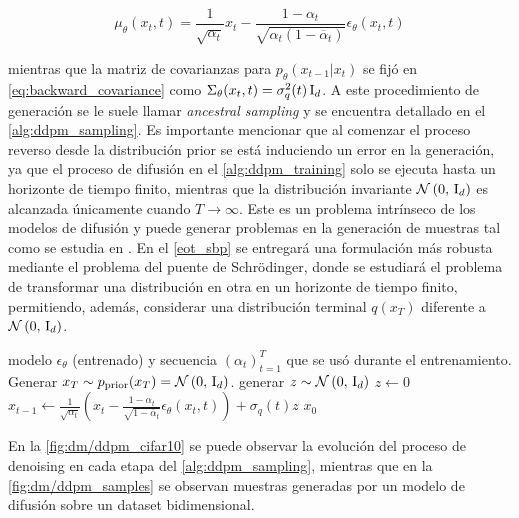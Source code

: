 \begin{equation*}
    \mu_\theta(x_t,t) = \frac{1}{\sqrt{\alpha_t}}x_t - \frac{1-\alpha_t}{\sqrt{\alpha_t(1-\overline{\alpha}_t)}}\epsilon_\theta(x_t,t)
\end{equation*}

mientras que la matriz de covarianzas para $p_\theta(x_{t-1}|x_t)$ se fijó en \eqref{eq:backward_covariance} como $\Sigma_\theta(x_t,t)=\sigma_q^2(t)\operatorname{I}_{d}$. A este procedimiento de generación se le suele llamar \textit{ancestral sampling} y se encuentra detallado en el \autoref{alg:ddpm_sampling}. Es importante mencionar que al comenzar el proceso reverso desde la distribución prior se está induciendo un error en la generación, ya que el proceso de difusión en el \autoref{alg:ddpm_training} solo se ejecuta hasta un horizonte de tiempo finito, mientras que la distribución invariante $\mathcal{N}\left(0,\,\operatorname{I}_{d}\right)$ es alcanzada únicamente cuando $T\to\infty$. Este es un problema intrínseco de los modelos de difusión y puede generar problemas en la generación de muestras tal como se estudia en \cite{debortoli2023diffusion}. En el \autoref{eot_sbp} se entregará una formulación más robusta mediante el problema del puente de Schrödinger, donde se estudiará el problema de transformar una distribución en otra en un horizonte de tiempo finito, permitiendo, además, considerar una distribución terminal $q(x_T)$ diferente a $\mathcal{N}\left(0,\,\operatorname{I}_{d}\right)$.

\begin{algorithm}
    \caption{Ancestral sampling}
    \label{alg:ddpm_sampling}
    \begin{algorithmic}[1]
        \Require modelo $\epsilon_\theta$ (entrenado) y secuencia $(\alpha_t)_{t=1}^T$ que se usó durante el entrenamiento.
        \State Generar $x_T\sim p_{\operatorname{prior}}(x_T)=\mathcal{N}\left(0,\,\operatorname{I}_{d}\right)$.
        \State generar $z\sim\mathcal{N}\left(0,\,\operatorname{I}_{d}\right)$
        \Else
        \State $z \gets 0$
        \EndIf
        \State $x_{t-1} \gets \frac{1}{\sqrt{\alpha_t}}\left(x_t-\frac{1-\alpha_t}{\sqrt{1-\overline{\alpha}_t}}\epsilon_\theta(x_t,t)\right) + \sigma_q(t) z$
        \EndFor
        \State \Return $x_0$
    \end{algorithmic}
\end{algorithm}

En la \autoref{fig:dm/ddpm_cifar10} se puede observar la evolución del proceso de denoising en cada etapa del \autoref{alg:ddpm_sampling}, mientras que en la \autoref{fig:dm/ddpm_samples} se observan muestras generadas por un modelo de difusión sobre un dataset bidimensional.

